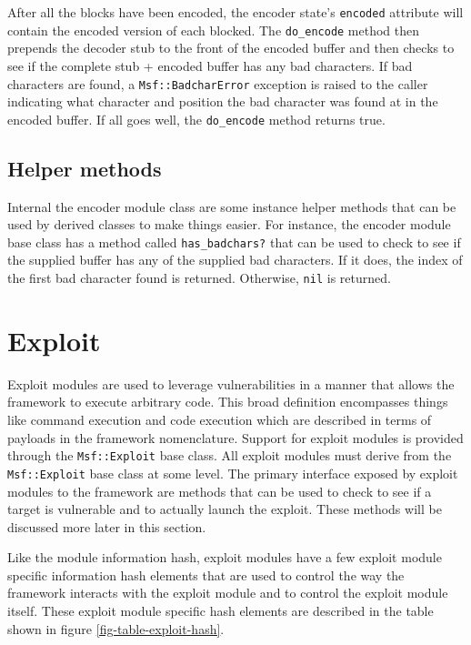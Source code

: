 \documentclass{report}
\begin{document}
\par
After all the blocks have been encoded, the encoder state's
\texttt{encoded} attribute will contain the encoded version of each
blocked.  The \texttt{do\_encode} method then prepends the decoder
stub to the front of the encoded buffer and then checks to see if
the complete stub + encoded buffer has any bad characters.  If bad
characters are found, a \texttt{Msf::BadcharError} exception is
raised to the caller indicating what character and position the bad
character was found at in the encoded buffer.  If all goes well, the
\texttt{do\_encode} method returns true.

        \subsection{Helper methods}

\par
Internal the encoder module class are some instance helper methods
that can be used by derived classes to make things easier.  For
instance, the encoder module base class has a method called
\texttt{has\_badchars?} that can be used to check to see if the
supplied buffer has any of the supplied bad characters.  If it does,
the index of the first bad character found is returned.  Otherwise,
\texttt{nil} is returned.

    \section{Exploit}

\par
Exploit modules are used to leverage vulnerabilities in a manner
that allows the framework to execute arbitrary code.  This broad
definition encompasses things like command execution and code
execution which are described in terms of payloads in the framework
nomenclature.  Support for exploit modules is provided through the
\texttt{Msf::Exploit} base class.  All exploit modules must derive
from the \texttt{Msf::Exploit} base class at some level.  The
primary interface exposed by exploit modules to the framework are
methods that can be used to check to see if a target is vulnerable
and to actually launch the exploit.  These methods will be discussed
more later in this section.

\par
Like the module information hash, exploit modules have a few exploit
module specific information hash elements that are used to control
the way the framework interacts with the exploit module and to
control the exploit module itself.  These exploit module specific
hash elements are described in the table shown in figure
\ref{fig-table-exploit-hash}.
\end{document}
